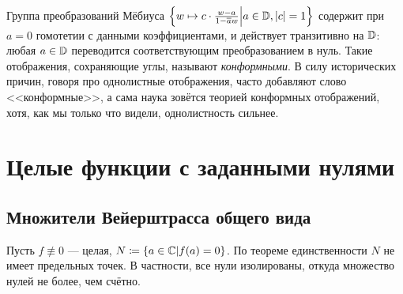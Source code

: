 \documentclass[a4paper]{report}
\begin{document}
    Группа преобразований Мёбиуса $\left\{w \mapsto c \cdot \frac{w - a}{1 - \overline{a}w}\middle|a \in \mathbb{D}, |c| = 1\right\}$ содержит при $a = 0$ гомотетии с данными коэффициентами, и действует транзитивно на $\mathbb{D}$: любая $a \in \mathbb{D}$ переводится соответствующим преобразованием в нуль.
    Такие отображения, сохраняющие углы, называют \emph{конформными}.
    В силу исторических причин, говоря про однолистные отображения, часто добавляют слово <<конформные>>, а сама наука зовётся теорией конформных отображений, хотя, как мы только что видели, однолистность сильнее.
    \section{Целые функции с заданными нулями}
    \subsection{Множители Вейерштрасса общего вида}
    Пусть $f \not\equiv 0$ --- целая, $N \coloneqq \left\{a \in \mathbb{C}\middle|f(a) = 0\right\}$.
    По теореме единственности $N$ не имеет предельных точек.
    В частности, все нули изолированы, откуда множество нулей не более, чем счётно.
\end{document}
